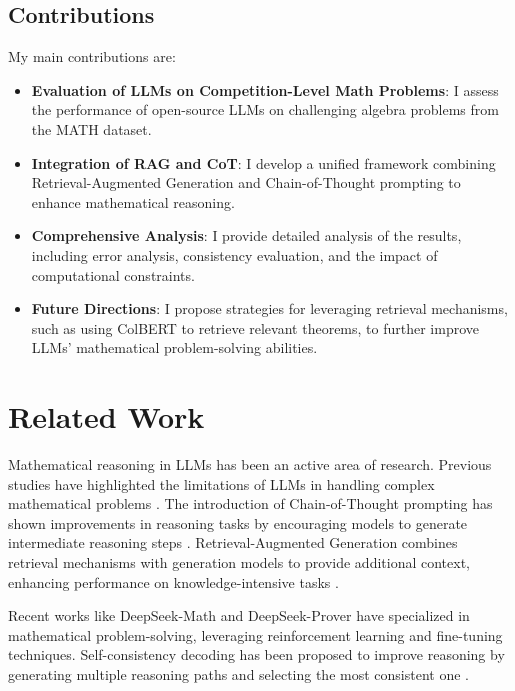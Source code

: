 \documentclass[11pt,a4paper]{article}
\begin{document}
\subsection{Contributions}
My main contributions are:
\begin{itemize}[noitemsep,nolistsep]
    \item \textbf{Evaluation of LLMs on Competition-Level Math Problems}: I assess the performance of open-source LLMs on challenging algebra problems from the MATH dataset.
    \item \textbf{Integration of RAG and CoT}: I develop a unified framework combining Retrieval-Augmented Generation and Chain-of-Thought prompting to enhance mathematical reasoning.
    \item \textbf{Comprehensive Analysis}: I provide detailed analysis of the results, including error analysis, consistency evaluation, and the impact of computational constraints.
    \item \textbf{Future Directions}: I propose strategies for leveraging retrieval mechanisms, such as using ColBERT to retrieve relevant theorems, to further improve LLMs' mathematical problem-solving abilities.
\end{itemize}

\section{Related Work}
Mathematical reasoning in LLMs has been an active area of research. Previous studies have highlighted the limitations of LLMs in handling complex mathematical problems \cite{hendrycks2021measuringmathematicalproblemsolving}. The introduction of Chain-of-Thought prompting has shown improvements in reasoning tasks by encouraging models to generate intermediate reasoning steps \cite{wei2023chainofthoughtpromptingelicitsreasoning}. Retrieval-Augmented Generation combines retrieval mechanisms with generation models to provide additional context, enhancing performance on knowledge-intensive tasks \cite{lewis2021retrievalaugmentedgenerationknowledgeintensivenlp}.

Recent works like DeepSeek-Math \cite{shao2024deepseekmathpushinglimitsmathematical} and DeepSeek-Prover \cite{xin2024deepseekproverv15harnessingproofassistant} have specialized in mathematical problem-solving, leveraging reinforcement learning and fine-tuning techniques. Self-consistency decoding has been proposed to improve reasoning by generating multiple reasoning paths and selecting the most consistent one \cite{wang2023selfconsistencyimproveschainthought}.
\end{document}

